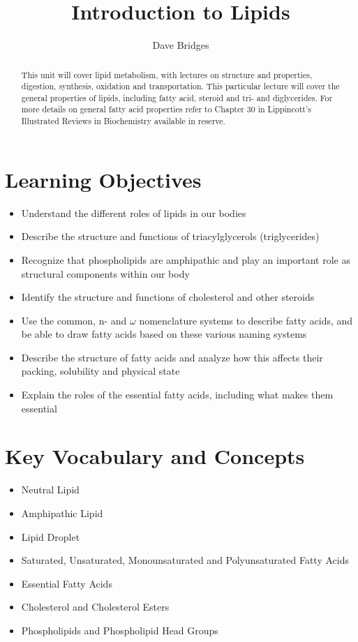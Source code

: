 \documentclass{tufte-handout}
\title{Introduction to Lipids}
\author{Dave Bridges}
\date{}  %
\begin{document}
\maketitle%

\begin{abstract}
\noindent This unit will cover lipid metabolism, with lectures on structure and properties, digestion, synthesis, oxidation and transportation.  This particular lecture will cover the general properties of lipids, including fatty acid, steroid and tri- and diglycerides.  For more details on general fatty acid properties refer to Chapter 30 in Lippincott's Illustrated Reviews in Biochemistry available in reserve\cite{Ferrier2017}.
\end{abstract}

\tableofcontents

\pagebreak
\section{Learning Objectives}

\begin{itemize}
\item Understand the different roles of lipids in our bodies
\item Describe the structure and functions of triacylglycerols (triglycerides)
\item Recognize that phospholipids are amphipathic and play an important role as structural components within our body
\item Identify the structure and functions of cholesterol and other steroids
\item Use the common, n- and $\omega$ nomenclature systems to describe fatty acids, and be able to draw fatty acids based on these various naming systems
\item Describe the structure of fatty acids and analyze how this affects their packing, solubility and physical state
\item Explain the roles of the essential fatty acids, including what makes them essential

\end{itemize}

\section{Key Vocabulary and Concepts}

\begin{itemize}
\item Neutral Lipid
\item Amphipathic Lipid
\item Lipid Droplet
\item Saturated, Unsaturated, Monounsaturated and Polyunsaturated Fatty Acids
\item Essential Fatty Acids
\item Cholesterol and Cholesterol Esters
\item Phospholipids and Phospholipid Head Groups

\end{itemize}
\end{document}
